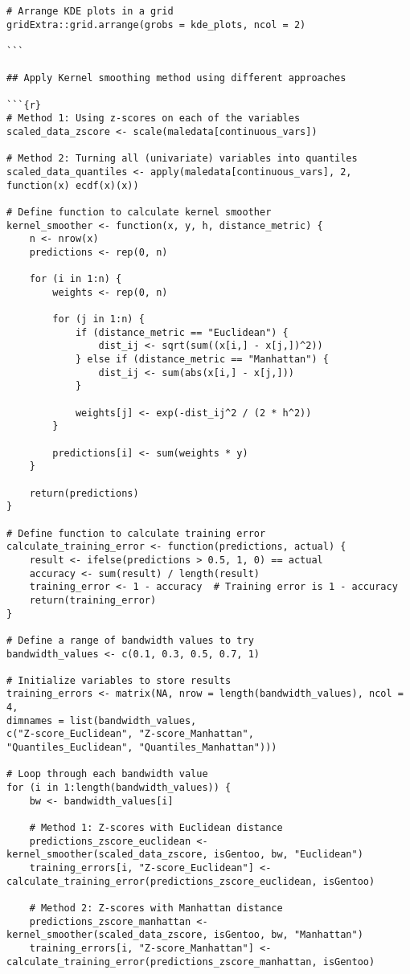 \documentclass[12pt,doublespace]{article}
\begin{document}
\begin{itemize}
\begin{verbatim}
# Arrange KDE plots in a grid
gridExtra::grid.arrange(grobs = kde_plots, ncol = 2)

```

## Apply Kernel smoothing method using different approaches

```{r}
# Method 1: Using z-scores on each of the variables 
scaled_data_zscore <- scale(maledata[continuous_vars])

# Method 2: Turning all (univariate) variables into quantiles
scaled_data_quantiles <- apply(maledata[continuous_vars], 2, function(x) ecdf(x)(x))

# Define function to calculate kernel smoother
kernel_smoother <- function(x, y, h, distance_metric) {
	n <- nrow(x)
	predictions <- rep(0, n)
	
	for (i in 1:n) {
		weights <- rep(0, n)
		
		for (j in 1:n) {
			if (distance_metric == "Euclidean") {
				dist_ij <- sqrt(sum((x[i,] - x[j,])^2))
			} else if (distance_metric == "Manhattan") {
				dist_ij <- sum(abs(x[i,] - x[j,]))
			}
			
			weights[j] <- exp(-dist_ij^2 / (2 * h^2))
		}
		
		predictions[i] <- sum(weights * y)
	}
	
	return(predictions)
}

# Define function to calculate training error
calculate_training_error <- function(predictions, actual) {
	result <- ifelse(predictions > 0.5, 1, 0) == actual
	accuracy <- sum(result) / length(result)
	training_error <- 1 - accuracy  # Training error is 1 - accuracy
	return(training_error)
}

# Define a range of bandwidth values to try
bandwidth_values <- c(0.1, 0.3, 0.5, 0.7, 1)

# Initialize variables to store results
training_errors <- matrix(NA, nrow = length(bandwidth_values), ncol = 4,
dimnames = list(bandwidth_values, 
c("Z-score_Euclidean", "Z-score_Manhattan",
"Quantiles_Euclidean", "Quantiles_Manhattan")))

# Loop through each bandwidth value
for (i in 1:length(bandwidth_values)) {
	bw <- bandwidth_values[i]
	
	# Method 1: Z-scores with Euclidean distance
	predictions_zscore_euclidean <- kernel_smoother(scaled_data_zscore, isGentoo, bw, "Euclidean")
	training_errors[i, "Z-score_Euclidean"] <- calculate_training_error(predictions_zscore_euclidean, isGentoo)
	
	# Method 2: Z-scores with Manhattan distance
	predictions_zscore_manhattan <- kernel_smoother(scaled_data_zscore, isGentoo, bw, "Manhattan")
	training_errors[i, "Z-score_Manhattan"] <- calculate_training_error(predictions_zscore_manhattan, isGentoo)
	

\end{verbatim}
\end{itemize}
\end{document}
